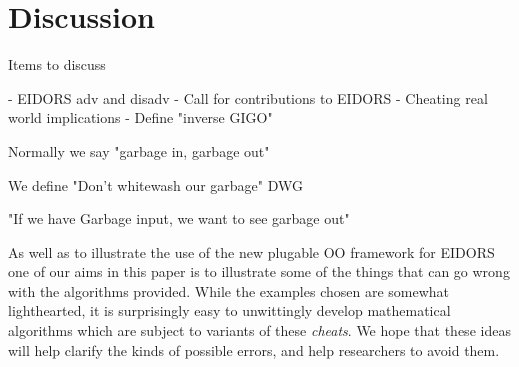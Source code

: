 \documentclass[12pt]{iopart}
\begin{document}
\section{
 Discussion
}

Items to discuss

 - EIDORS adv and disadv
 - Call for contributions to EIDORS
 - Cheating real world implications
 - Define "inverse GIGO"

    Normally we say "garbage in, garbage out"

  We define "Don't whitewash our garbage" DWG

    "If we have Garbage input, we want to see garbage out"



As well as to illustrate the use of the new plugable OO
framework for EIDORS one of our aims in this paper is to
illustrate some of the things
that can go wrong with the algorithms provided.
While the examples chosen are somewhat lighthearted, it
is surprisingly easy to unwittingly develop mathematical
algorithms which are subject to variants of these {\em cheats}.
We hope that these ideas will help clarify the kinds of
possible errors, and help researchers to avoid them.
\end{document}

